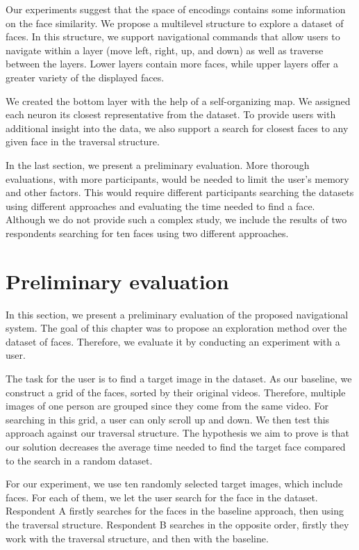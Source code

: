 Our experiments suggest that the space of encodings contains some information on the face similarity. We propose a multilevel structure to explore a dataset of faces. In this structure, we support navigational commands that allow users to navigate within a layer (move left, right, up, and down) as well as traverse between the layers. Lower layers contain more faces, while upper layers offer a greater variety of the displayed faces.

We created the bottom layer with the help of a self-organizing map. We assigned each neuron its closest representative from the dataset. To provide users with additional insight into the data, we also support a search for closest faces to any given face in the traversal structure.

In the last section, we present a preliminary evaluation. More thorough evaluations, with more participants, would be needed to limit the user's memory and other factors. This would require different participants searching the datasets using different approaches and evaluating the time needed to find a face. Although we do not provide such a complex study, we include the results of two respondents searching for ten faces using two different approaches.

\section{Preliminary evaluation}

In this section, we present a preliminary evaluation of the proposed navigational system. The goal of this chapter was to propose an exploration method over the dataset of faces. Therefore, we evaluate it by conducting an experiment with a user.

The task for the user is to find a target image in the dataset. As our baseline, we construct a grid of the faces, sorted by their original videos. Therefore, multiple images of one person are grouped since they come from the same video. For searching in this grid, a user can only scroll up and down. We then test this approach against our traversal structure. The hypothesis we aim to prove is that our solution decreases the average time needed to find the target face compared to the search in a random dataset.

For our experiment, we use ten randomly selected target images, which include faces. For each of them, we let the user search for the face in the dataset. Respondent A firstly searches for the faces in the baseline approach, then using the traversal structure. Respondent B searches in the opposite order, firstly they work with the traversal structure, and then with the baseline.

